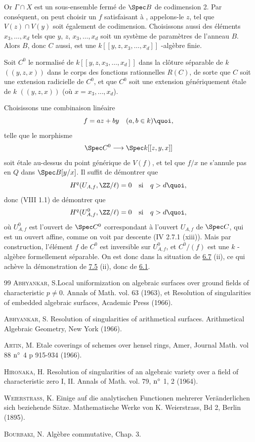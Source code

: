 \documentclass[10pt]{../fichiers-configuration-latex/smfart}
\begin{document}
Or $\Gamma\cap X$ est un sous-ensemble fermé de $\Spec B$ de codimension
2. Par conséquent, on peut choisir un $f$ satisfaisant à ,
appelons-le $z$, tel que $V(z)\cap V(y)$ soit également de
codimension. Choisissons aussi des éléments
$x_{3},\ldots,x_{d}$ tels que $y$, $z$, $x_{3},\ldots,x_{d}$ soit un
système de paramètres de l'anneau $B$. Alors $B$, donc $C$ aussi, est
une $k[[y,z,x_{3},\ldots,x_{d}]]$ -algèbre finie.

Soit $C^{0}$ le normalisé de $k[[y,z,x_{3},\ldots,x_{d}]]$ dans la
clôture séparable de $k$ $((y,z,x))$ dans le corps des fonctions
rationnelles $R(C)$, de sorte que $C$ soit une extension radicielle de
$C^{0}$, et que $C^{0}$ soit une extension génériquement étale de $k$
$((y,z,x))$ (où $x=x_{3},\ldots,x_{d}$).

Choisissons une combinaison linéaire
$$
f=az+by\quad (a,b\in k){\quoi},
$$
telle que le morphisme
$$
\Spec C^{0}\longrightarrow \Spec k[[z,y,x]]
$$
soit étale au-dessus du point générique de $V(f)$, et tel que $f/x$ ne
s'annule pas en $Q$ dans $\Spec B[y/x]$. Il suffit de démontrer que
$$
H^{q}(U_{A,f},\ZZ/\ell)=0\quad\text{\rm si}\quad q>d{\quoi},
$$
donc (VIII 1.1) de démontrer que
$$
H^{q}(U^{0}_{A,f},\ZZ/\ell)=0\quad\text{\rm si}\quad
q>d{\quoi},
$$
où $U^{0}_{A,f}$ est l'ouvert de $\Spec C^{0}$ correspondant à
l'ouvert $U_{A,f}$ de $\Spec C$, qui est un ouvert affine, comme on
voit par descente (\EGA IV 2.7.1 (xiii)). Mais par construction,
l'élément $f$ de $C^{0}$ est inversible sur $U^{0}_{A,f}$, et
$C^{0}/(f)$ est une $k$ -algèbre formellement séparable. On est donc
dans la situation de \hyperref[XIX.lem6.7]{6.7} (ii), ce qui achève 
la démonstration de \hyperref[XIX.lem7.5]{7.5} (ii), donc de \hyperref[XIX.thm6.1]{6.1}.

\begin{thebibliography}{99}
 \textsc{Abhyankar}, S.\pageoriginale Local uniformization on
algebraic surfaces over ground fields of characteristic $p\neq
0$. Annals of Math. vol. 63 (1963), et Resolution of singularities of
embedded algebraic surfaces, Academic Press (1966).

 \textsc{Abhyankar}, S. Resolution of singularities of
arithmetical surfaces. Arithmetical Algebraic Geometry, New York
(1966).

 \textsc{Artin}, M. Etale coverings of schemes over hensel
rings, Amer, Journal Math. vol 88 ${\rm n^{\circ}}$ 4 p 915-934
(1966).

 \textsc{Hironaka}, H. Resolution of singularities of an
algebraic variety over a field of characteristic zero I, II. Annals of
Math. vol. 79, ${\rm n^{\circ}}$ 1, 2 (1964).

 \textsc{Weierstrass}, K. Einige auf die analytischen
Functionen mehrerer Veränderlichen sich beziehende
Sätze. Mathematische Werke von K. Weierstrass, Bd 2, Berlin (1895).

 \textsc{Bourbaki}, N. Algèbre commutative, Chap. 3.
\end{thebibliography}



\ifx\danslelivre\undefined
\end{document}
